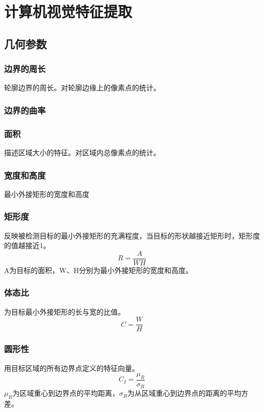 \section{计算机视觉特征提取}

\subsection{几何参数}

\subsubsection{边界的周长}
轮廓边界的周长。对轮廓边缘上的像素点的统计。

\subsubsection{边界的曲率}

\subsubsection{面积}
描述区域大小的特征。对区域内总像素点的统计。

\subsubsection{宽度和高度}
最小外接矩形的宽度和高度

\subsubsection{矩形度}
反映被检测目标的最小外接矩形的充满程度，当目标的形状越接近矩形时，矩形度的值越接近1。
    \begin{displaymath}
    R=\frac{A}{WH}
    \end{displaymath}
    A为目标的面积，W、H分别为最小外接矩形的宽度和高度。

\subsubsection{体态比}
为目标最小外接矩形的长与宽的比值。
    \begin{displaymath}
    C=\frac{W}{H}
    \end{displaymath}
    
\subsubsection{圆形性}
用目标区域的所有边界点定义的特征向量。
    \begin{displaymath}
    C_{I}=\frac{\mu_{R}}{\sigma_{R}}
    \end{displaymath}
    $\mu_{R}$为区域重心到边界点的平均距离，$\sigma_{R}$为从区域重心到边界点的距离的平均方差。

